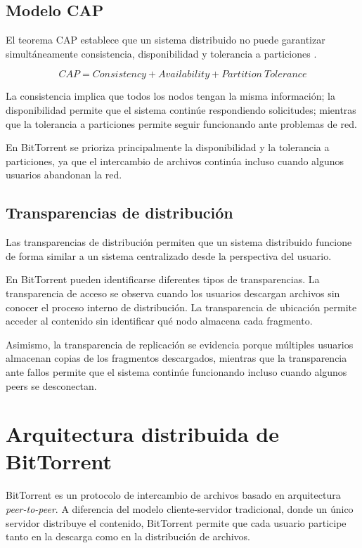 \documentclass[12pt]{article}
\begin{document}
\subsection{Modelo CAP}

El teorema CAP establece que un sistema distribuido no puede garantizar simultáneamente consistencia, disponibilidad y tolerancia a particiones \cite{ref6}.

\begin{equation}
CAP = Consistency + Availability + Partition\ Tolerance
\end{equation}

La consistencia implica que todos los nodos tengan la misma información; la disponibilidad permite que el sistema continúe respondiendo solicitudes; mientras que la tolerancia a particiones permite seguir funcionando ante problemas de red.

En BitTorrent se prioriza principalmente la disponibilidad y la tolerancia a particiones, ya que el intercambio de archivos continúa incluso cuando algunos usuarios abandonan la red.

\subsection{Transparencias de distribución}

Las transparencias de distribución permiten que un sistema distribuido funcione de forma similar a un sistema centralizado desde la perspectiva del usuario.

En BitTorrent pueden identificarse diferentes tipos de transparencias. La transparencia de acceso se observa cuando los usuarios descargan archivos sin conocer el proceso interno de distribución. La transparencia de ubicación permite acceder al contenido sin identificar qué nodo almacena cada fragmento.

Asimismo, la transparencia de replicación se evidencia porque múltiples usuarios almacenan copias de los fragmentos descargados, mientras que la transparencia ante fallos permite que el sistema continúe funcionando incluso cuando algunos peers se desconectan.

\section{Arquitectura distribuida de BitTorrent}

BitTorrent es un protocolo de intercambio de archivos basado en arquitectura \textit{peer-to-peer}. A diferencia del modelo cliente-servidor tradicional, donde un único servidor distribuye el contenido, BitTorrent permite que cada usuario participe tanto en la descarga como en la distribución de archivos.
\end{document}
